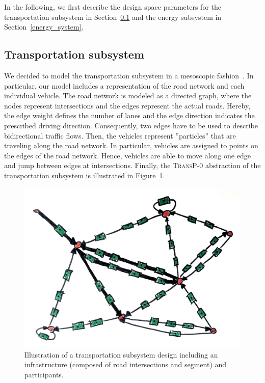 In the following, we first describe the design space parameters for the transportation subsystem in Section~\ref{transport} and the energy subsystem in Section~\ref{energy_system}.

\subsection{Transportation subsystem}
\label{transport}

We decided to model the transportation subsystem in a mesoscopic fashion~\cite{?}. In particular, our model includes a representation of the road network and each individual vehicle. The road network is modeled as a directed graph, where the nodes represent intersections and the edges represent the actual roads. Hereby, the edge weight defines the number of lanes and the edge direction indicates the prescribed driving direction. Consequently, two edges have to be used to describe bidirectional traffic flows. Then, the vehicles represent ''particles'' that are traveling along the road network. In particular, vehicles are assigned to points on the edges of the road network. Hence, vehicles are able to move along one edge and jump between edges at intersections. Finally, the \textsc{TransP-0} abstraction of the transportation subsystem is illustrated in Figure~\ref{transport_illustration}.

\begin{figure}[h]
	\includegraphics[width=\columnwidth]{./gfx/transportation_system.jpg}
	\caption{Illustration of a transportation subsystem design including an infrastructure (composed of road intersections and segment) and participants.}
	\label{transport_illustration}
\end{figure}

